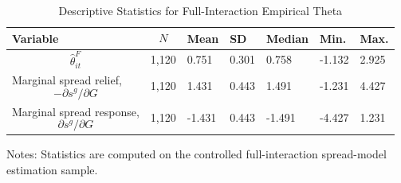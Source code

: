 \begin{table}[H]\centering
\begin{threeparttable}
\caption{Descriptive Statistics for Full-Interaction Empirical Theta}
\label{tab:theta_descriptive_stats}
\scriptsize
\begin{tabularx}{\textwidth}{lYYYYYY}
\toprule
Variable & $$N$$ & Mean & SD & Median & Min. & Max. \\
\midrule
$$\widehat{\theta}^{F}_{it}$$ & 1,120 & 0.751 & 0.301 & 0.758 & -1.132 & 2.925 \\
Marginal spread relief, $$-\partial s^g/\partial G$$ & 1,120 & 1.431 & 0.443 & 1.491 & -1.231 & 4.427 \\
Marginal spread response, $$\partial s^g/\partial G$$ & 1,120 & -1.431 & 0.443 & -1.491 & -4.427 & 1.231 \\
\bottomrule
\end{tabularx}
\begin{tablenotes}[flushleft]\footnotesize
\item Notes: Statistics are computed on the controlled full-interaction spread-model estimation sample.
\end{tablenotes}
\end{threeparttable}
\end{table}
